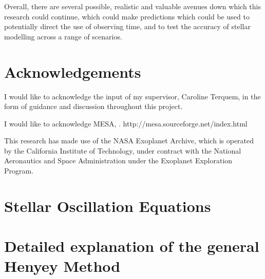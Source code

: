 \documentclass[11pt]{amsart}
\begin{document}
Overall, there are several possible, realistic and valuable avenues down which this research could continue, which could make predictions which could be used to potentially direct the use of observing time, and to test the accuracy of stellar modelling across a range of scenarios.





\section{Acknowledgements}  \label{Acknowledgements}

I would like to acknowledge the input of my supervisor, Caroline Terquem, in the form of guidance and discussion throughout this project.

I would like to acknowledge MESA, \cite{Paxton2011}. http://mesa.sourceforge.net/index.html

This research has made use of the NASA Exoplanet Archive, which is operated by the California Institute of Technology, under contract with the National Aeronautics and Space Administration under the Exoplanet Exploration Program.
















\newpage

\appendix

\section{Stellar Oscillation Equations} \label{ap:Osc}


\section{Detailed explanation of the general Henyey Method}   \label{ap:Henyey}
\end{document}
